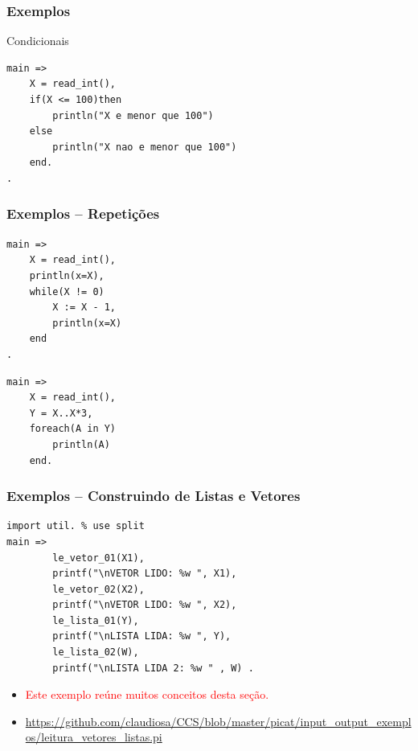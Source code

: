 
\begin{frame}[fragile]

\frametitle{Exemplos}
    
    \begin{block}{Condicionais}
        \begin{lstlisting}[frame=single]
main =>
    X = read_int(),
    if(X <= 100)then
        println("X e menor que 100")
    else
        println("X nao e menor que 100")
    end.
.
        \end{lstlisting}
    
    \end{block}
\end{frame}

\begin{frame}[fragile]

\frametitle{Exemplos -- Repetições}
    
   \begin{lstlisting}[frame=single]
main =>
    X = read_int(),
    println(x=X),
    while(X != 0)
        X := X - 1,
        println(x=X)
    end
.
   \end{lstlisting}
        
   \begin{lstlisting}[frame=single]
main =>
    X = read_int(),
    Y = X..X*3,
    foreach(A in Y)
        println(A)
    end.
        \end{lstlisting}
    
\end{frame}

\begin{frame}[fragile]
\frametitle{Exemplos -- Construindo de Listas e Vetores}    
       
       
\begin{footnotesize}
\begin{verbatim}
import util. % use split
main => 
        le_vetor_01(X1),
        printf("\nVETOR LIDO: %w ", X1),
        le_vetor_02(X2),
        printf("\nVETOR LIDO: %w ", X2),
        le_lista_01(Y),
        printf("\nLISTA LIDA: %w ", Y),
        le_lista_02(W),
        printf("\nLISTA LIDA 2: %w " , W) .
\end{verbatim}
\end{footnotesize}       

\begin{small}
\begin{itemize}
  \item \textcolor{red}{Este exemplo reúne muitos conceitos desta seção.}  
  \item \textcolor{red}{\url{https://github.com/claudiosa/CCS/blob/master/picat/input_output_exemplos/leitura_vetores_listas.pi}}  
\end{itemize}
\end{small}

\end{frame}


